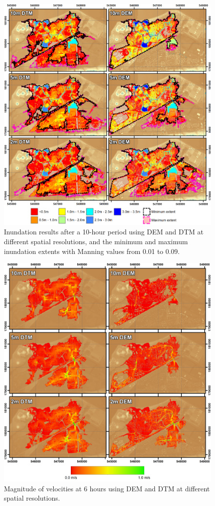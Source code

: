 \documentclass[11pt,english,a4paper]{article}
\begin{document}
\begin{figure}[tpb]
\centering
\includegraphics[width=1.0\textwidth]{Thamesmead_AllDepths.png}
\caption{Inundation results after a 10-hour period using DEM and DTM at different spatial resolutions, and the minimum and maximum inundation extents with Manning values from 0.01 to 0.09.}
\label{Thamesmead_Inundation}
\end{figure}
\begin{figure}[tpb]
\centering
\includegraphics[width=1.0\textwidth]{Thamesmead_AllVelocities.png}
\caption{Magnitude of velocities at 6 hours using DEM and DTM at different spatial resolutions. }
\label{Thamesmead_Velocities}
\end{figure}
\end{document}
